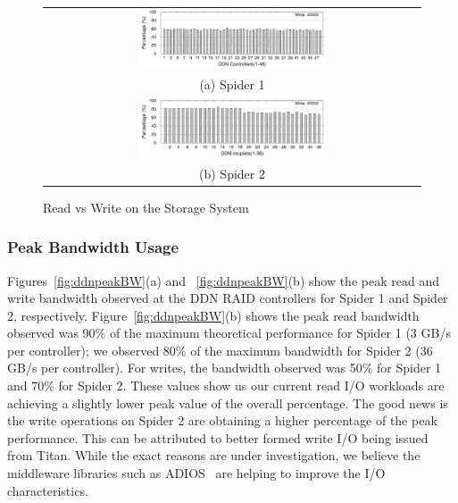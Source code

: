 \begin{figure}[t]
\begin{center}
\begin{tabular}{c}
{\includegraphics[width=0.5\textwidth]{./figs/spider1-wr-ratio.eps}}\\
{(a) Spider 1}\\
{\includegraphics[width=0.5\textwidth]{./figs/spider2-wr-ratio.eps}}\\
{(b) Spider 2}\\
\end{tabular}
\vspace{-0.1in}
\caption{Read vs Write on the Storage System}
\label{fig:rwratio}
\end{center}
\end{figure}

\subsubsection{Peak Bandwidth Usage}

Figures~\ref{fig:ddnpeakBW}(a) and ~\ref{fig:ddnpeakBW}(b) show the
peak read and write bandwidth observed at the DDN RAID controllers for Spider 1
and Spider 2, respectively.  Figure~\ref{fig:ddnpeakBW}(b) shows the peak read
bandwidth observed was 90\% of the 
maximum theoretical performance for Spider 1 (3 GB/s per controller); we observed 80\% of the maximum bandwidth for 
Spider 2 (36 GB/s per controller). For writes, the bandwidth observed was 50\% for Spider 1 and 70\% for
Spider 2. These values show us our current read I/O workloads are achieving a 
slightly lower peak value of the overall percentage. The good news is the write
operations on Spider 2 are obtaining a higher percentage of the peak performance.
This can be
attributed to better formed write I/O being issued from Titan. While 
the exact reasons are under investigation, we believe the middleware 
libraries such as ADIOS~\cite{adios} are helping to improve the I/O characteristics. 


